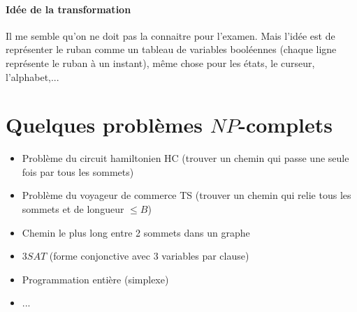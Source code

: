 \paragraph{Idée de la transformation} Il me semble qu'on ne doit pas la connaitre
pour l'examen. Mais l'idée est de représenter le ruban comme un tableau de
variables booléennes (chaque ligne représente le ruban à un instant),
même chose pour les états, le curseur, l'alphabet,...


\section{Quelques problèmes $NP$-complets}
\begin{itemize}
	\item Problème du circuit hamiltonien HC (trouver un chemin qui passe
		une seule fois par tous les sommets)
	\item Problème du voyageur de commerce TS (trouver un chemin qui relie
		tous les sommets et de longueur $\leq B$)
	\item Chemin le plus long entre 2 sommets dans un graphe
	\item $3SAT$ (forme conjonctive avec 3 variables par clause)
	\item Programmation entière (simplexe)
	\item ...
\end{itemize}
